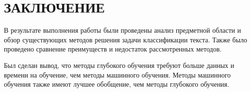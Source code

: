 \section*{ЗАКЛЮЧЕНИЕ}

В результате выполнения работы были проведены анализ предметной области и обзор существующих методов решения задачи классификации текста. Также было проведено сравнение преимуществ и недостаток рассмотренных методов.

Был сделан вывод, что методы глубокого обучения требуют больше данных и времени на обучение, чем методы машинного обучения. Методы машинного обучения также имеют лучшее обобщение, чем методы глубокого обучения.
